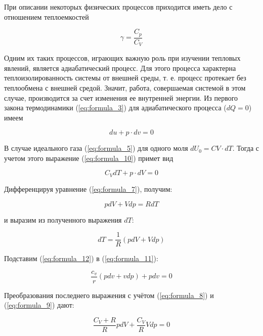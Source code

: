 При описании некоторых физических процессов приходится иметь дело с отношением теплоемкостей

\begin{equation}
    \gamma = \frac{C_p}{C_V}
    \label{eq:formula_9}
\end{equation}

Одним их таких процессов, играющих важную роль при изучении тепловых явлений, является адиабатический процесс. Для этого процесса характерна теплоизолированность системы от внешней среды, т. е. процесс протекает без теплообмена с внешней средой. Значит, работа, совершаемая системой в этом случае, производится за счет изменения ее внутренней энергии. Из первого закона термодинамики (\ref{eq:formula_3}) для адиабатического процесса ($dQ = 0$) имеем 

\begin{equation}
    d u + p \cdot d v = 0
    \label{eq:formula_10}
\end{equation}

В случае идеального газа (\ref{eq:formula_5}) для одного моля $dU_0 = CV \cdot dT$. Тогда с учетом этого выражение (\ref{eq:formula_10}) примет вид

\begin{equation}
    C_V d T + p \cdot dV = 0
    \label{eq:formula_11}
\end{equation}

Дифференцируя уравнение (\ref{eq:formula_7}), получим:

\begin{equation*}
    p d V + V d p = R d T
\end{equation*}

и выразим из полученного выражения $dT$:

\begin{equation}
    d T = \frac{1}{R} \left (p d V + V d p \right )
    \label{eq:formula_12}
\end{equation}

Подставим (\ref{eq:formula_12}) в (\ref{eq:formula_11}):

\begin{equation*}
    \frac{c_v}{r} \left (p d v + v d p \right ) + p d v = 0
\end{equation*}

Преобразования последнего выражения с учётом (\ref{eq:formula_8}) и (\ref{eq:formula_9}) дают:

\begin{equation*}
    \frac{C_V + R}{R} p d V + \frac{C_V}{R} V d p = 0
\end{equation*}

